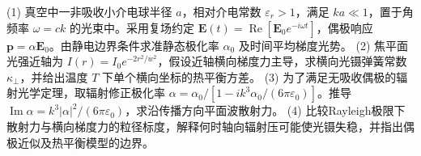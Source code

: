 (1) 真空中一非吸收小介电球半径 \(a\)，相对介电常数 \(\varepsilon_r>1\)，满足 \(ka\ll1\)，置于角频率 \(\omega=ck\) 的光束中。采用复场约定 \(\boldsymbol E(t)=\operatorname{Re}[\boldsymbol E_0e^{-i\omega t}]\)，偶极响应 \(\boldsymbol p=\alpha\boldsymbol E_0\)。由静电边界条件求准静态极化率 \(\alpha_0\) 及时间平均梯度光势。
(2) 焦平面光强近轴为 \(I(r)=I_0e^{-2r^2/w^2}\)，假设近轴横向梯度力主导，求横向光镊弹簧常数 \(\kappa_\perp\)，并给出温度 \(T\) 下单个横向坐标的热平衡方差。
(3) 为了满足无吸收偶极的辐射光学定理，取辐射修正极化率 \(\alpha=\alpha_0/[1-i k^3\alpha_0/(6\pi\varepsilon_0)]\)。推导 \(\operatorname{Im}\alpha=k^3|\alpha|^2/(6\pi\varepsilon_0)\)，求沿传播方向平面波散射力。
(4) 比较Rayleigh极限下散射力与横向梯度力的粒径标度，解释何时轴向辐射压可能使光镊失稳，并指出偶极近似及热平衡模型的边界。
